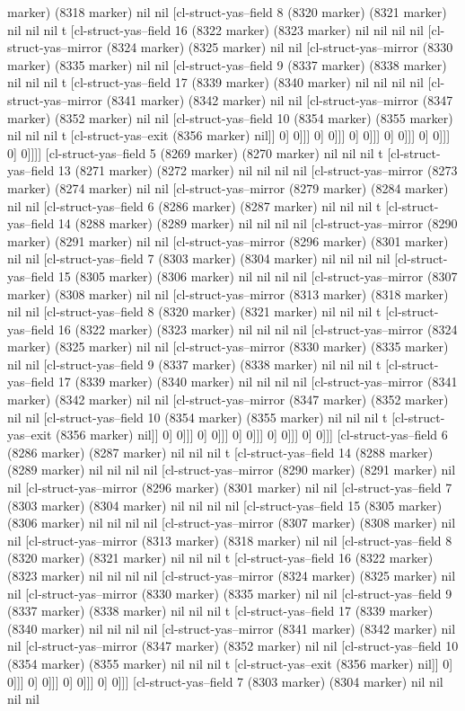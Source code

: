 {{marker) (8318 marker) nil nil [cl-struct-yas--field 8 (8320 marker) (8321 marker) nil nil nil t [cl-struct-yas--field 16 (8322 marker) (8323 marker) nil nil nil nil [cl-struct-yas--mirror (8324 marker) (8325 marker) nil nil [cl-struct-yas--mirror (8330 marker) (8335 marker) nil nil [cl-struct-yas--field 9 (8337 marker) (8338 marker) nil nil nil t [cl-struct-yas--field 17 (8339 marker) (8340 marker) nil nil nil nil [cl-struct-yas--mirror (8341 marker) (8342 marker) nil nil [cl-struct-yas--mirror (8347 marker) (8352 marker) nil nil [cl-struct-yas--field 10 (8354 marker) (8355 marker) nil nil nil t [cl-struct-yas--exit (8356 marker) nil]] 0] 0]]] 0] 0]]] 0] 0]]] 0] 0]]] 0] 0]]] 0] 0]]]] [cl-struct-yas--field 5 (8269 marker) (8270 marker) nil nil nil t [cl-struct-yas--field 13 (8271 marker) (8272 marker) nil nil nil nil [cl-struct-yas--mirror (8273 marker) (8274 marker) nil nil [cl-struct-yas--mirror (8279 marker) (8284 marker) nil nil [cl-struct-yas--field 6 (8286 marker) (8287 marker) nil nil nil t [cl-struct-yas--field 14 (8288 marker) (8289 marker) nil nil nil nil [cl-struct-yas--mirror (8290 marker) (8291 marker) nil nil [cl-struct-yas--mirror (8296 marker) (8301 marker) nil nil [cl-struct-yas--field 7 (8303 marker) (8304 marker) nil nil nil nil [cl-struct-yas--field 15 (8305 marker) (8306 marker) nil nil nil nil [cl-struct-yas--mirror (8307 marker) (8308 marker) nil nil [cl-struct-yas--mirror (8313 marker) (8318 marker) nil nil [cl-struct-yas--field 8 (8320 marker) (8321 marker) nil nil nil t [cl-struct-yas--field 16 (8322 marker) (8323 marker) nil nil nil nil [cl-struct-yas--mirror (8324 marker) (8325 marker) nil nil [cl-struct-yas--mirror (8330 marker) (8335 marker) nil nil [cl-struct-yas--field 9 (8337 marker) (8338 marker) nil nil nil t [cl-struct-yas--field 17 (8339 marker) (8340 marker) nil nil nil nil [cl-struct-yas--mirror (8341 marker) (8342 marker) nil nil [cl-struct-yas--mirror (8347 marker) (8352 marker) nil nil [cl-struct-yas--field 10 (8354 marker) (8355 marker) nil nil nil t [cl-struct-yas--exit (8356 marker) nil]] 0] 0]]] 0] 0]]] 0] 0]]] 0] 0]]] 0] 0]]] [cl-struct-yas--field 6 (8286 marker) (8287 marker) nil nil nil t [cl-struct-yas--field 14 (8288 marker) (8289 marker) nil nil nil nil [cl-struct-yas--mirror (8290 marker) (8291 marker) nil nil [cl-struct-yas--mirror (8296 marker) (8301 marker) nil nil [cl-struct-yas--field 7 (8303 marker) (8304 marker) nil nil nil nil [cl-struct-yas--field 15 (8305 marker) (8306 marker) nil nil nil nil [cl-struct-yas--mirror (8307 marker) (8308 marker) nil nil [cl-struct-yas--mirror (8313 marker) (8318 marker) nil nil [cl-struct-yas--field 8 (8320 marker) (8321 marker) nil nil nil t [cl-struct-yas--field 16 (8322 marker) (8323 marker) nil nil nil nil [cl-struct-yas--mirror (8324 marker) (8325 marker) nil nil [cl-struct-yas--mirror (8330 marker) (8335 marker) nil nil [cl-struct-yas--field 9 (8337 marker) (8338 marker) nil nil nil t [cl-struct-yas--field 17 (8339 marker) (8340 marker) nil nil nil nil [cl-struct-yas--mirror (8341 marker) (8342 marker) nil nil [cl-struct-yas--mirror (8347 marker) (8352 marker) nil nil [cl-struct-yas--field 10 (8354 marker) (8355 marker) nil nil nil t [cl-struct-yas--exit (8356 marker) nil]] 0] 0]]] 0] 0]]] 0] 0]]] 0] 0]]] [cl-struct-yas--field 7 (8303 marker) (8304 marker) nil nil nil nil }}
